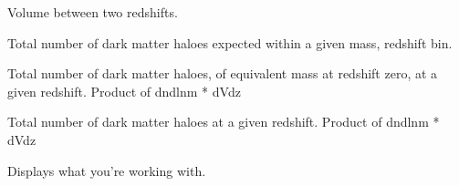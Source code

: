 \documentclass[letterpaper,10pt,english]{sphinxmanual}
\begin{document}
\begin{fulllineitems}
\begin{fulllineitems}
\end{fulllineitems}


\begin{fulllineitems}
\label{PyCosmo:PyCosmo.cosmology_prevec.Cosmology.V_between}
Volume between two redshifts.

\end{fulllineitems}


\begin{fulllineitems}
\label{PyCosmo:PyCosmo.cosmology_prevec.Cosmology.computeNinBin}
Total number of dark matter haloes expected within a given mass,
redshift bin.

\end{fulllineitems}


\begin{fulllineitems}
\label{PyCosmo:PyCosmo.cosmology_prevec.Cosmology.dNdlnm0dz}
Total number of dark matter haloes,
of equivalent mass at redshift zero, at a given redshift.
Product of dndlnm * dVdz

\end{fulllineitems}


\begin{fulllineitems}
\label{PyCosmo:PyCosmo.cosmology_prevec.Cosmology.dNdlnmdz}
Total number of dark matter haloes at a given redshift.
Product of dndlnm * dVdz

\end{fulllineitems}


\begin{fulllineitems}
\label{PyCosmo:PyCosmo.cosmology_prevec.Cosmology.display}
Displays what you're working with.


\end{fulllineitems}
\end{fulllineitems}
\end{document}
